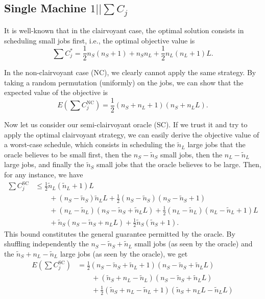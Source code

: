 \documentclass{article}
\begin{document}
\subsection{Single Machine \(1||\sum C_j\)}

It is well-known that in the clairvoyant case, the optimal solution consists in scheduling small
jobs first, i.e., the optimal objective value is
\[
    \sum C_j^*=\frac{1}{2}n_S(n_S+1)+n_Sn_L+\frac{1}{2}n_L(n_L+1)L.
\]

In the non-clairvoyant case (NC), we clearly cannot apply the same strategy. By taking a random
permutation (uniformly) on the jobs, we can show that the expected value of the objective is
\[
    E(\sum C_j^{\mathrm{NC}})=\frac{1}{2}(n_S+n_L+1)(n_S+n_LL).
\]

Now let us consider our semi-clairvoyant oracle (SC). If we trust it and try to apply the optimal
clairvoyant strategy, we can easily derive the objective value of a worst-case schedule, which
consists in scheduling the \(\tilde{n}_L\) large jobs that the oracle believes to be small first,
then the \(n_S-\tilde{n}_S\) small jobs, then the \(n_L-\tilde{n}_L\) large jobs, and finally the
\(\tilde{n}_S\) small jobs that the oracle believes to be large. Then, for any instance, we have
\begin{align*}
    \sum C_j^{\mathrm{SC}}
        &\le\frac{1}{2}\tilde{n}_L(\tilde{n}_L+1)L\\
        &\qquad+(n_S-\tilde{n}_S)\tilde{n}_LL+\frac{1}{2}(n_S-\tilde{n}_S)(n_S-\tilde{n}_S+1)\\
        &\qquad+(n_L-\tilde{n}_L)(n_S-\tilde{n}_S+\tilde{n}_LL)+\frac{1}{2}(n_L-\tilde{n}_L)(n_L-\tilde{n}_L+1)L\\
        &\qquad+\tilde{n}_S(n_S-\tilde{n}_S+n_LL)+\frac{1}{2}\tilde{n}_S(\tilde{n}_S+1).
\end{align*}
This bound constitutes the general guarantee permitted by the oracle. By shuffling independently the
\(n_S-\tilde{n}_S+\tilde{n}_L\) small jobs (as seen by the oracle) and the
\(\tilde{n}_S+n_L-\tilde{n}_L\) large jobs (as seen by the oracle), we get
\begin{align*}
    E(\sum C_j^{\mathrm{SC}})
        &=\frac{1}{2}(n_S-\tilde{n}_S+\tilde{n}_L+1)(n_S-\tilde{n}_S+\tilde{n}_LL)\\
        &\qquad+(\tilde{n}_S+n_L-\tilde{n}_L)(n_S-\tilde{n}_S+\tilde{n}_LL)\\
        &\qquad+\frac{1}{2}(\tilde{n}_S+n_L-\tilde{n}_L+1)(\tilde{n}_S+n_LL-\tilde{n}_LL)
\end{align*}
\end{document}

